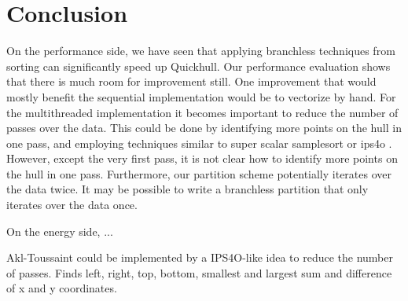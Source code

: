 \section{Conclusion}

On the performance side, we have seen that applying branchless techniques
from sorting can significantly speed up Quickhull. 
Our performance evaluation shows that there is much room for improvement still. 
One improvement that would mostly benefit the sequential implementation would 
be to vectorize by hand. For the multithreaded implementation it 
becomes important to reduce the number of passes over the data. This could be 
done by identifying more points on the hull in one pass, and employing 
techniques similar to super scalar samplesort \cite{ssss} or ips4o \cite{ips4o}. 
However, except the very first pass, it is not clear how to 
identify more points on the hull in one pass. Furthermore, our partition 
scheme potentially iterates over the data twice. It may be possible to write a 
branchless partition that only iterates over the data once.

On the energy side, ...

Akl-Toussaint could be implemented by a IPS4O-like idea to reduce the
number of passes. Finds left, right, top, bottom, smallest and largest
sum and difference of x and y coordinates.
